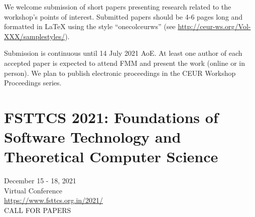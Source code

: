 \documentclass[prodmode,acmtecs]{acmsmall} %
\begin{document}
\begin{itemize}
 We welcome submission of short papers presenting research related to the workshop's points of interest. Submitted papers should be 4-6 pages long and formatted in LaTeX using the style ``onecolceurws'' (see \href{http://ceur-ws.org/Vol-XXX/samplestyles/}{http://ceur-ws.org/Vol-XXX/samplestyles/}). 
 
 Submission is continuous until 14 July 2021 AoE. At least one author of each accepted paper is expected to attend FMM and present the work (online or in person). We plan to publish electronic proceedings in the CEUR Workshop Proceedings series.  
 
\end{itemize}\section{FSTTCS 2021: Foundations of Software Technology and Theoretical Computer Science}\label{FSTTCS2021}  December 15 - 18, 2021\\ 
  Virtual Conference\\ 
  \href{https://www.fsttcs.org.in/2021/}{https://www.fsttcs.org.in/2021/}\\ 
CALL FOR PAPERS 
\end{document}
